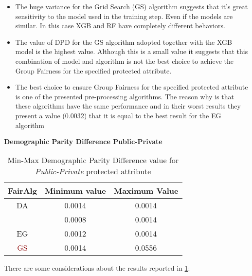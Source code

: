 \begin{itemize}
    \item The huge variance for the Grid Search (GS) algorithm suggests that it's great sensitivity to the model used in the training step. Even if the models are similar. In this case XGB and RF have completely different behaviors.

    \item The value of DPD for the GS algorithm adopted together with the XGB model is the highest value. Although this is a small value it suggests that this combination of model and algorithm is not the best choice to achieve the Group Fairness for the specified protected attribute.

    \item The best choice to ensure Group Fairness for the specified protected attribute is one of the presented pre-processing algorithms. The reason why is that these algorithms have the same performance and in their worst results they present a value (0.0032) that it is equal to the best result for the EG algorithm
\end{itemize}

\textbf{Demographic Parity Difference Public-Private}
\begin{table}
    \centering
    \begin{tabular}{|c|c|c|}
        \hline
        \textbf{FairAlg} & \textbf{Minimum value} & \textbf{Maximum Value} \\
        \hline
        DA & 0.0014 & 0.0014 \\
        \hline
        {\textcolor{darkgreen}{FtU} & 0.0008 & 0.0014 \\
        \hline
        EG & 0.0012 & 0.0014 \\
        \hline
        \textcolor{darkred}{GS} & 0.0014 & 0.0556 \\
        \hline
    \end{tabular}
    \caption{Min-Max Demographic Parity Difference value for \emph{Public-Private} protected attribute}
    \label{tab:pp_dpd}
\end{table}

There are some considerations about the results reported in \cref{tab:pp_dpd}:

